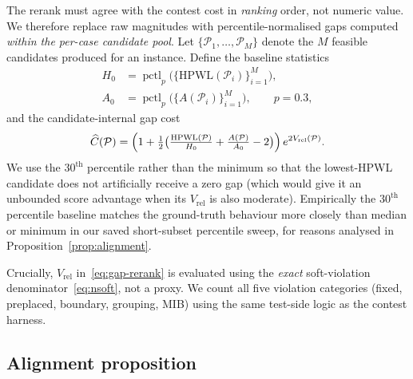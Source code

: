 \documentclass[nolineno]{ieeeaccess}
\begin{document}
The rerank must agree with the contest cost in \emph{ranking} order,
not numeric value. We therefore replace raw magnitudes with
percentile-normalised gaps computed \emph{within the per-case candidate
pool}. Let $\{\mathcal{P}_1,\ldots,\mathcal{P}_M\}$ denote the $M$
feasible candidates produced for an instance. Define the baseline
statistics
\begin{align}
H_0 &= \operatorname{pctl}_{p}\bigl(\{\text{HPWL}(\mathcal{P}_i)\}_{i=1}^M\bigr),\\
A_0 &= \operatorname{pctl}_{p}\bigl(\{A(\mathcal{P}_i)\}_{i=1}^M\bigr), \qquad p = 0.3,
\label{eq:baselines}
\end{align}
and the candidate-internal gap cost
\begin{equation}
\widehat{C}(\mathcal{P}) = \Bigl(1 + \tfrac{1}{2}\bigl(
   \tfrac{\text{HPWL}(\mathcal{P})}{H_0} +
   \tfrac{A(\mathcal{P})}{A_0} - 2\bigr)\Bigr)\,e^{2V_{\text{rel}}(\mathcal{P})}.
\label{eq:gap-rerank}
\end{equation}
We use the $30^{\text{th}}$ percentile rather than the minimum so that
the lowest-HPWL candidate does not artificially receive a zero gap
(which would give it an unbounded score advantage when its
$V_{\text{rel}}$ is also moderate). Empirically the $30^{\text{th}}$ percentile
baseline matches the ground-truth behaviour more closely than median or
minimum in our saved short-subset percentile sweep, for reasons analysed in
Proposition~\ref{prop:alignment}.

Crucially, $V_{\text{rel}}$ in~\eqref{eq:gap-rerank} is evaluated using the
\emph{exact} soft-violation denominator~\eqref{eq:nsoft}, not a proxy.
We count all five violation categories (fixed, preplaced, boundary,
grouping, MIB) using the same test-side logic as the contest harness.

\subsection{Alignment proposition}
\label{sec:rerank-proposition}
\end{document}

